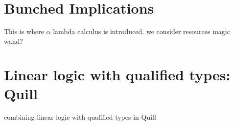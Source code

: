 \section{Bunched Implications}
This is where $\alpha$ lambda calculus is introduced. we consider resources
magic wand?


\section{Linear logic with qualified types: Quill}
combining linear logic with qualified types in Quill \cite{morris_best_2016}




